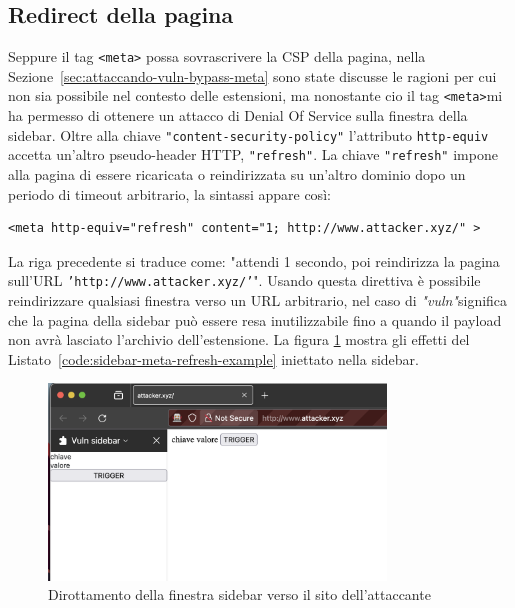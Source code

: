 \documentclass{sapthesis}
\newcommand{\code}[1]{\texttt{#1}}
\newcommand{\refSection}[1]{Sezione~\ref{#1}}
\newcommand{\refCode}[1]{Listato~\ref{#1}}
\newcommand{\vuln}{\textit{"vuln"}}
\newcommand{\tagHTML}[1]{\code{<#1>}}
\newcommand{\meta}{\tagHTML{meta}}
\begin{document}
        \subsection{Redirect della pagina}
            Seppure il tag \meta{} possa sovrascrivere la CSP della pagina, nella \refSection{sec:attaccando-vuln-bypass-meta}
            sono state discusse le ragioni per cui non sia possibile nel contesto delle estensioni, ma
            nonostante cio il tag \meta mi ha permesso di ottenere un attacco di Denial Of Service sulla finestra 
            della sidebar. Oltre alla chiave \code{"content-security-policy"}
            l'attributo \code{http-equiv} accetta un'altro pseudo-header HTTP, \code{"refresh"}. La chiave
            \code{"refresh"} impone alla pagina di essere ricaricata o reindirizzata su un'altro dominio dopo
            un periodo di timeout arbitrario, la sintassi appare così:
            \begin{lstlisting}[label=code:sidebar-meta-refresh-example,numbers=none]
<meta http-equiv="refresh" content="1; http://www.attacker.xyz/" >

\end{lstlisting}
            La riga precedente si traduce come: "attendi 1 secondo, poi reindirizza la pagina sull'URL 
            \code{'http://www.attacker.xyz/'}".
            Usando questa direttiva è possibile reindirizzare qualsiasi finestra verso un URL arbitrario,
            nel caso di \vuln significa che la pagina della sidebar può essere resa inutilizzabile fino a
            quando il payload non avrà lasciato l'archivio dell'estensione. La figura \ref{fig:sidebar-meta-refresh-1}
            mostra gli effetti del \refCode{code:sidebar-meta-refresh-example} iniettato nella sidebar.

            \begin{figure}
                \centering
                \includegraphics[width=0.8\textwidth]{sidebar-meta-refresh-1.png}
                \caption{Dirottamento della finestra sidebar verso il sito dell'attaccante}
                \label{fig:sidebar-meta-refresh-1}
            \end{figure}
\end{document}
